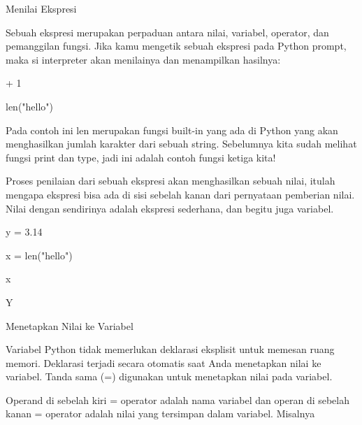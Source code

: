 \vspace{12pt}
\noindent 
Menilai Ekspresi \par
\vspace{12pt}
\noindent 
Sebuah ekspresi merupakan perpaduan antara nilai, variabel, operator, dan pemanggilan fungsi. Jika kamu mengetik sebuah ekspresi pada Python prompt, maka si interpreter akan $  $menilainya $  $dan menampilkan hasilnya: \par
\vspace{12pt}
 + 1 \par
{} \par
\noindent 
len("hello") \par
{} \par
\noindent 
Pada contoh ini $  $len $  $merupakan fungsi built-in yang ada di Python yang akan menghasilkan jumlah karakter dari sebuah string. Sebelumnya kita sudah melihat fungsi $  $print $  $dan $  $type, jadi ini adalah contoh fungsi ketiga kita! \par
\vspace{12pt}
\noindent 
Proses $  $penilaian dari sebuah ekspresi $  $akan menghasilkan sebuah nilai, itulah mengapa ekspresi bisa ada di sisi sebelah kanan dari pernyataan pemberian nilai. $  $Nilai $  $dengan sendirinya $  $adalah ekspresi $  $sederhana, $  $dan begitu juga $  $variabel. \par
\vspace{12pt}
 \par
{} \par
\noindent 
y = 3.14 \par
\noindent 
x = len("hello") \par
\noindent 
x \par
{} \par
\noindent 
Y \par
\vspace{12pt}
 \par
\vspace{12pt}
\noindent 
Menetapkan Nilai ke Variabel \par
\vspace{12pt}
\noindent 
Variabel Python tidak memerlukan deklarasi eksplisit untuk memesan ruang memori. $  $Deklarasi terjadi secara otomatis saat Anda menetapkan nilai ke variabel. $  $Tanda sama (=) digunakan untuk menetapkan nilai pada variabel. \par
\vspace{12pt}
\noindent 
Operand di sebelah kiri = operator adalah nama variabel dan operan di sebelah kanan = operator adalah nilai yang tersimpan dalam variabel. $  $Misalnya  \par
